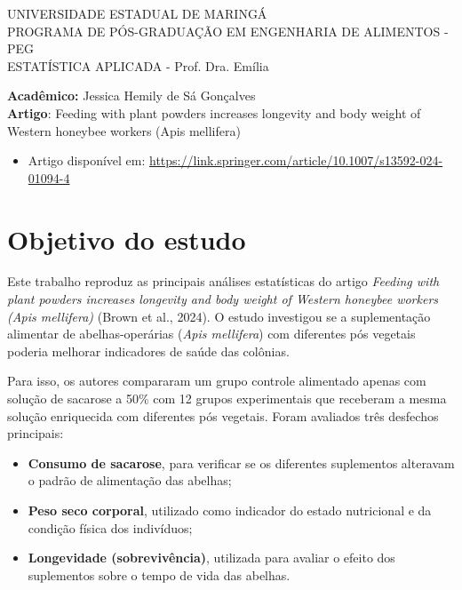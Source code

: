 \documentclass[
  brazilian,
  12pt,
  a4paper,
]{article}
\author{}
\date{\vspace{-2.5em}}
\providecommand{\tightlist}{%
  \setlength{\itemsep}{0pt}\setlength{\parskip}{0pt}}
\begin{document}
\thispagestyle{empty}

\begin{center}
\fontsize{12pt}{14pt}\selectfont
\singlespacing
  UNIVERSIDADE ESTADUAL DE MARINGÁ\\
  PROGRAMA DE PÓS-GRADUAÇÃO EM ENGENHARIA DE ALIMENTOS - PEG\\
  ESTATÍSTICA APLICADA - Prof. Dra. Emília\\
\end{center}

\begin{flushleft}
\fontsize{12pt}{14pt}\selectfont
\singlespacing
    \textbf{Acadêmico:} Jessica Hemily de Sá Gonçalves \\
    \textbf{Artigo}: Feeding with plant powders increases longevity and body weight of Western honeybee workers (Apis mellifera)
  \end{flushleft}

\fontsize{9pt}{11pt}\selectfont

\begin{itemize}
\tightlist
\item
  Artigo disponível em:
  \url{https://link.springer.com/article/10.1007/s13592-024-01094-4}
\end{itemize}

\section{Objetivo do estudo}\label{objetivo-do-estudo}

Este trabalho reproduz as principais análises estatísticas do artigo
\emph{Feeding with plant powders increases longevity and body weight of
Western honeybee workers (Apis mellifera)} (Brown et al., 2024). O
estudo investigou se a suplementação alimentar de abelhas-operárias
(\emph{Apis mellifera}) com diferentes pós vegetais poderia melhorar
indicadores de saúde das colônias.

Para isso, os autores compararam um grupo controle alimentado apenas com
solução de sacarose a 50\% com 12 grupos experimentais que receberam a
mesma solução enriquecida com diferentes pós vegetais. Foram avaliados
três desfechos principais:

\begin{itemize}
\tightlist
\item
  \textbf{Consumo de sacarose}, para verificar se os diferentes
  suplementos alteravam o padrão de alimentação das abelhas;
\item
  \textbf{Peso seco corporal}, utilizado como indicador do estado
  nutricional e da condição física dos indivíduos;
\item
  \textbf{Longevidade (sobrevivência)}, utilizada para avaliar o efeito
  dos suplementos sobre o tempo de vida das abelhas.
\end{itemize}
\end{document}
